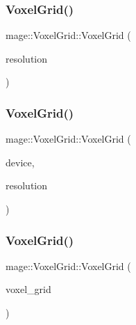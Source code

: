 \subsubsection{\texorpdfstring{Voxel\+Grid()}{VoxelGrid()}\hspace{0.1cm}{\footnotesize\ttfamily [1/4]}}
{\footnotesize\ttfamily mage\+::\+Voxel\+Grid\+::\+Voxel\+Grid (\begin{DoxyParamCaption}\item[{size\+\_\+t}]{resolution }\end{DoxyParamCaption})\hspace{0.3cm}{\ttfamily [explicit]}}

\hypertarget{classmage_1_1_voxel_grid_a6933eec208760a5167a79dde4950598f}{}\label{classmage_1_1_voxel_grid_a6933eec208760a5167a79dde4950598f} 
\subsubsection{\texorpdfstring{Voxel\+Grid()}{VoxelGrid()}\hspace{0.1cm}{\footnotesize\ttfamily [2/4]}}
{\footnotesize\ttfamily mage\+::\+Voxel\+Grid\+::\+Voxel\+Grid (\begin{DoxyParamCaption}\item[{I\+D3\+D11\+Device5 $\ast$}]{device,  }\item[{size\+\_\+t}]{resolution }\end{DoxyParamCaption})\hspace{0.3cm}{\ttfamily [explicit]}}

\hypertarget{classmage_1_1_voxel_grid_a8f2c6b7b3539ef2dcc16b7a8bfc428fd}{}\label{classmage_1_1_voxel_grid_a8f2c6b7b3539ef2dcc16b7a8bfc428fd} 
\subsubsection{\texorpdfstring{Voxel\+Grid()}{VoxelGrid()}\hspace{0.1cm}{\footnotesize\ttfamily [3/4]}}
{\footnotesize\ttfamily mage\+::\+Voxel\+Grid\+::\+Voxel\+Grid (\begin{DoxyParamCaption}\item[{const \hyperlink{classmage_1_1_voxel_grid}{Voxel\+Grid} \&}]{voxel\+\_\+grid }\end{DoxyParamCaption})\hspace{0.3cm}{\ttfamily [delete]}}

